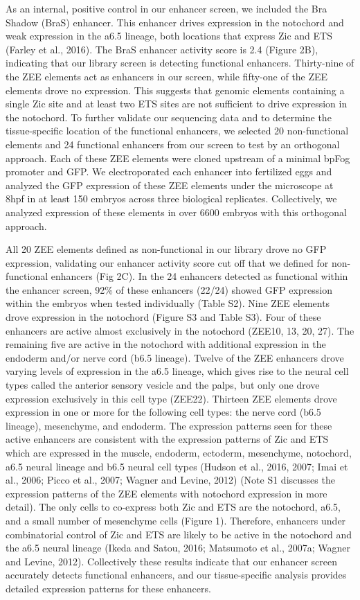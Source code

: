As an internal, positive control in our enhancer screen, we included the Bra Shadow (BraS) enhancer. This enhancer drives expression in the notochord and weak expression in the a6.5 lineage, both locations that express Zic and ETS (Farley et al., 2016). The BraS enhancer activity score is 2.4 (Figure 2B), indicating that our library screen is detecting functional enhancers. Thirty-nine of the ZEE elements act as enhancers in our screen, while fifty-one of the ZEE elements drove no expression. This suggests that genomic elements containing a single Zic site and at least two ETS sites are not sufficient to drive expression in the notochord. To further validate our sequencing data and to determine the tissue-specific location of the functional enhancers, we selected 20 non-functional elements and 24 functional enhancers from our screen to test by an orthogonal approach. Each of these ZEE elements were cloned upstream of a minimal bpFog promoter and GFP. We electroporated each enhancer into fertilized eggs and analyzed the GFP expression of these ZEE elements under the microscope at 8hpf in at least 150 embryos across three biological replicates. Collectively, we analyzed expression of these elements in over 6600 embryos with this orthogonal approach. 

All 20 ZEE elements defined as non-functional in our library drove no GFP expression, validating our enhancer activity score cut off that we defined for non-functional enhancers (Fig 2C). In the 24 enhancers detected as functional within the enhancer screen, 92\% of these enhancers (22/24) showed GFP expression within the embryos when tested individually (Table S2). Nine ZEE elements drove expression in the notochord (Figure S3 and Table S3). Four of these enhancers are active almost exclusively in the notochord (ZEE10, 13, 20, 27). The remaining five are active in the notochord with additional expression in the endoderm and/or nerve cord (b6.5 lineage). Twelve of the ZEE enhancers drove varying levels of expression in the a6.5 lineage, which gives rise to the neural cell types called the anterior sensory vesicle and the palps, but only one drove expression exclusively in this cell type (ZEE22). Thirteen ZEE elements drove expression in one or more for the following cell types: the nerve cord (b6.5 lineage), mesenchyme, and endoderm. The expression patterns seen for these active enhancers are consistent with the expression patterns of Zic and ETS which are expressed in the muscle, endoderm, ectoderm, mesenchyme, notochord, a6.5 neural lineage and b6.5 neural cell types (Hudson et al., 2016, 2007; Imai et al., 2006; Picco et al., 2007; Wagner and Levine, 2012) (Note S1 discusses the expression patterns of the ZEE elements with notochord expression in more detail). The only cells to co-express both Zic and ETS are the notochord, a6.5, and a small number of mesenchyme cells (Figure 1). Therefore, enhancers under combinatorial control of Zic and ETS are likely to be active in the notochord and the a6.5 neural lineage (Ikeda and Satou, 2016; Matsumoto et al., 2007a; Wagner and Levine, 2012). Collectively these results indicate that our enhancer screen accurately detects functional enhancers, and our tissue-specific analysis provides detailed expression patterns for these enhancers. 

